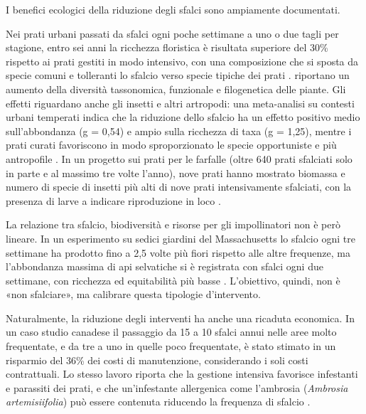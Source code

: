 \documentclass[
  a4paper,
]{book}
\begin{document}
I benefici ecologici della riduzione degli sfalci sono ampiamente documentati.

Nei prati urbani passati da sfalci ogni poche settimane a uno o due tagli per stagione, entro sei anni la ricchezza floristica è risultata superiore del 30\% rispetto ai prati gestiti in modo intensivo, con una composizione che si sposta da specie comuni e tolleranti lo sfalcio verso specie tipiche dei prati \citep{sehrt2020}.
\citet{chollet2018} riportano un aumento della diversità tassonomica, funzionale e filogenetica delle piante.
Gli effetti riguardano anche gli insetti e altri artropodi: una meta-analisi su contesti urbani temperati indica che la riduzione dello sfalcio ha un effetto positivo medio sull'abbondanza (g = 0,54) e ampio sulla ricchezza di taxa (g = 1,25), mentre i prati curati favoriscono in modo sproporzionato le specie opportuniste e più antropofile \citep{proske2022}.
In un progetto sui prati per le farfalle (oltre 640 prati sfalciati solo in parte e al massimo tre volte l'anno), nove prati hanno mostrato biomassa e numero di specie di insetti più alti di nove prati intensivamente sfalciati, con la presenza di larve a indicare riproduzione in loco \citep{wintergerst2021}.

La relazione tra sfalcio, biodiversità e risorse per gli impollinatori non è però lineare.
In un esperimento su sedici giardini del Massachusetts lo sfalcio ogni tre settimane ha prodotto fino a 2,5 volte più fiori rispetto alle altre frequenze, ma l'abbondanza massima di api selvatiche si è registrata con sfalci ogni due settimane, con ricchezza ed equitabilità più basse \citep{lerman2018}.
L'obiettivo, quindi, non è «non sfalciare», ma calibrare questa tipologie d'intervento.

Naturalmente, la riduzione degli interventi ha anche una ricaduta economica.
In un caso studio canadese il passaggio da 15 a 10 sfalci annui nelle aree molto frequentate, e da tre a uno in quelle poco frequentate, è stato stimato in un risparmio del 36\% dei costi di manutenzione, considerando i soli costi contrattuali.
Lo stesso lavoro riporta che la gestione intensiva favorisce infestanti e parassiti dei prati, e che un'infestante allergenica come l'ambrosia (\emph{Ambrosia artemisiifolia}) può essere contenuta riducendo la frequenza di sfalcio \citep{watson2020}.
\end{document}
